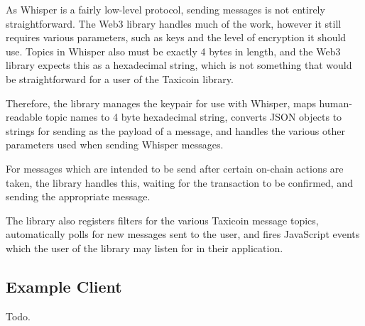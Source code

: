 As Whisper is a fairly low-level protocol, sending messages is not entirely straightforward. The Web3 library handles much of the work, however it still requires various parameters, such as keys and the level of encryption it should use. Topics in Whisper also must be exactly 4 bytes in length, and the Web3 library expects this as a hexadecimal string, which is not something that would be straightforward for a user of the Taxicoin library.

Therefore, the library manages the keypair for use with Whisper, maps human-readable topic names to 4 byte hexadecimal string, converts JSON objects to strings for sending as the payload of a message, and handles the various other parameters used when sending Whisper messages.

For messages which are intended to be send after certain on-chain actions are taken, the library handles this, waiting for the transaction to be confirmed, and sending the appropriate message.

The library also registers filters for the various Taxicoin message topics, automatically polls for new messages sent to the user, and fires JavaScript events which the user of the library may listen for in their application.

\subsection{Example Client}

Todo.
